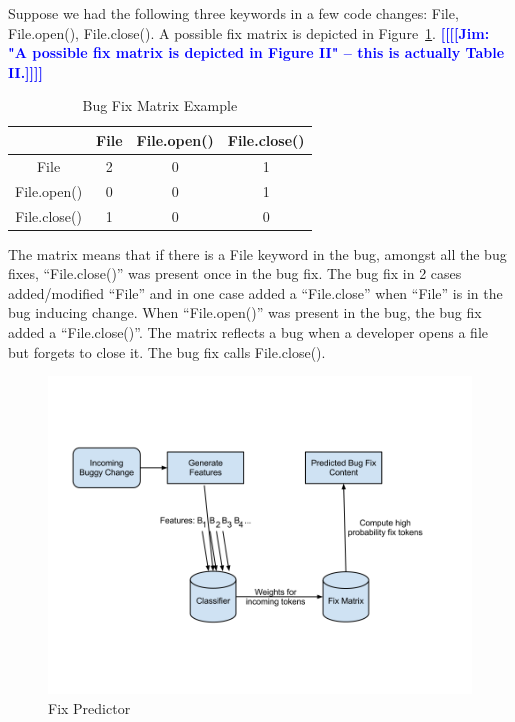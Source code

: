 \documentclass[10pt, conference, letterpaper, compsocconf]{IEEEtran}
\providecommand{\tabularnewline}{\\}
\newcommand{\todoc}[2]{{\textcolor{#1} {\textbf{[[#2]]}}}}
\newcommand{\todoblue}[1]{\todoc{blue}{\textbf{[[#1]]}}}
\newcommand{\jim}[1]{\todoblue{Jim: #1}}
\begin{document}
Suppose we had the following three keywords in
a few code changes: File, File.open(), File.close(). A possible fix
matrix is depicted in Figure~\ref{fig:example}. \jim{"A possible fix matrix is depicted in Figure II" -- this is actually Table II.}

\begin{table}\centering
\begin{tabular}{|c|c|c|c|}
\hline 
 & File & File.open() & File.close()\tabularnewline
\hline
\hline 
File & 2 & 0 & 1\tabularnewline
\hline 
File.open() & 0 & 0 & 1\tabularnewline
\hline 
File.close() & 1 & 0 & 0\tabularnewline
\hline 
\end{tabular}

\caption{Bug Fix Matrix Example}
\label{fig:example}
\end{table}

The matrix means that if there is a \textquotedbl{}File\textquotedbl{}
keyword in the bug, amongst all the bug fixes, ``File.close()''
was present once in the bug fix. The bug fix in 2 cases added/modified
``File'' and in one case added a ``File.close'' when ``File''
is in the bug inducing change. When ``File.open()'' was present
in the bug, the bug fix added a ``File.close()''. The matrix reflects
a bug when a developer opens a file but forgets to close it. The bug
fix calls File.close().

\begin{figure}[t]
\begin{center}
 \includegraphics[scale=0.3]{pictures/FixPredictor.png}
\end{center}
\caption{Fix Predictor}
\label{FixPredictor}
\end{figure}
\end{document}
